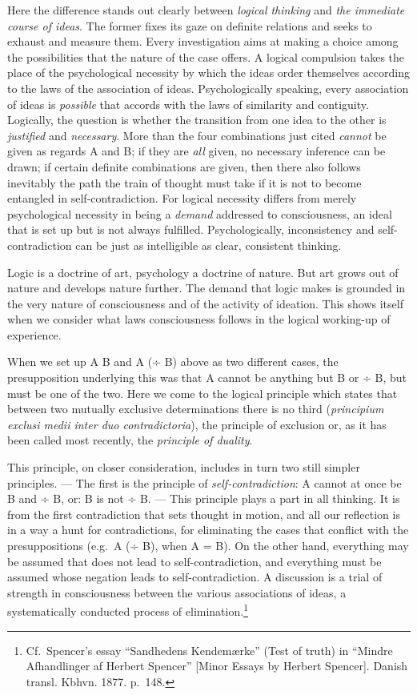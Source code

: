 \documentclass[12pt,a4paper]{book}
\newcommand{\opage}[1]{\marginnote{\footnotesize\textit{[#1]}}}
\begin{document}
Here the difference stands out clearly between \emph{logical thinking}
and \emph{the immediate course of ideas}. The former fixes its gaze on
definite relations and seeks to exhaust and measure them. Every
investigation aims at making a choice among the possibilities that the
nature of the case offers. A logical compulsion takes the place of the
psychological necessity by which the ideas order themselves according to
the laws of the association of ideas. Psychologically speaking, every
association of ideas is \emph{possible} that accords with the laws of
similarity and contiguity. Logically, the question is whether the
transition from one idea to the other is \emph{justified} and
\emph{necessary}. More than the four combinations just cited
\emph{cannot} be given as regards A and B; if they are \emph{all} given,
no necessary inference can be drawn; if certain definite combinations
are given, then there also follows inevitably the path the train of
thought must take if it is not to become entangled in
self-contradiction. For logical necessity differs from merely
psychological necessity in being a \emph{demand} addressed to
consciousness, an ideal that is set up but is not always fulfilled.
Psychologically, inconsistency and self-contradiction can be just as
intelligible as clear, consistent thinking.

Logic is a doctrine of art, psychology a doctrine of nature. But art
grows out of nature and develops nature further. The demand that logic
makes is grounded in the very nature of consciousness and of the
activity of ideation. This shows itself when we consider what laws
consciousness follows in the logical working-up of experience.

When we set up A B and A (÷ B) above as two different cases, the
presupposition underlying this was that A cannot be anything but B or
÷ B, but must be one of the two. Here we come to the logical principle
which states that between two mutually exclusive determinations there is
no third (\textit{principium exclusi medii inter duo contradictoria}),
the principle of exclusion or, as it has been called most recently, the
\emph{principle of duality}.

\opage{216}This principle, on closer consideration, includes in turn two
still simpler principles. --- The first is the principle of
\emph{self-contradiction}: A cannot at once be B and ÷ B, or: B is not
÷ B. --- This principle plays a part in all thinking. It is from the
first contradiction that sets thought in motion, and all our reflection
is in a way a hunt for contradictions, for eliminating the cases that
conflict with the presuppositions (e.g.\ A (÷ B), when A = B). On the
other hand, everything may be assumed that does not lead to
self-contradiction, and everything must be assumed whose negation leads
to self-contradiction. A discussion is a trial of strength in
consciousness between the various associations of ideas, a
systematically conducted
process of elimination.\footnote{Cf.\ Spencer's essay ``Sandhedens
Kendemærke'' (Test of truth) in ``Mindre Afhandlinger af Herbert
Spencer'' [Minor Essays by Herbert Spencer]. Danish transl. Kbhvn.
1877. p.~148.}
\end{document}
